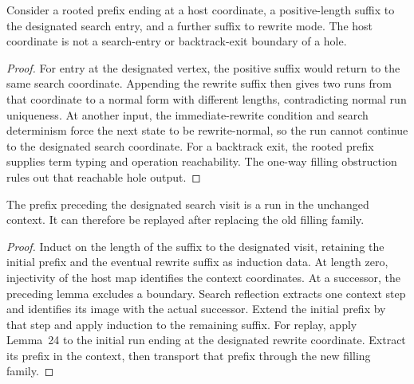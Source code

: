 \begin{lemma}
Consider a rooted prefix ending at a host coordinate, a positive-length suffix
to the designated search entry, and a further suffix to rewrite mode. The
host coordinate is not a search-entry or backtrack-exit boundary of a hole.
\end{lemma}
\begin{proof}
For entry at the designated vertex, the positive suffix would return to the
same search coordinate. Appending the rewrite suffix then gives two runs from
that coordinate to a normal form with different lengths, contradicting normal
run uniqueness. At another input, the immediate-rewrite condition and
search determinism force the next state to be rewrite-normal, so the run
cannot continue to the designated search coordinate. For a backtrack exit,
the rooted prefix supplies term typing and operation reachability. The one-way
filling obstruction rules out that reachable hole output.
\end{proof}


\begin{theorem}
The prefix preceding the designated search visit is a run in the unchanged
context. It can therefore be replayed after replacing the old filling family.
\end{theorem}
\begin{proof}
Induct on the length of the suffix to the designated visit, retaining the
initial prefix and the eventual rewrite suffix as induction data. At length
zero, injectivity of the host map identifies the context coordinates. At a
successor, the preceding lemma excludes a boundary. Search reflection extracts
one context step and identifies its image with the actual successor. Extend
the initial prefix by that step and apply induction to the remaining suffix.
For replay, apply Lemma~24 to the initial run ending at the designated rewrite
coordinate. Extract its prefix in the context, then transport that prefix
through the new filling family.
\end{proof}


